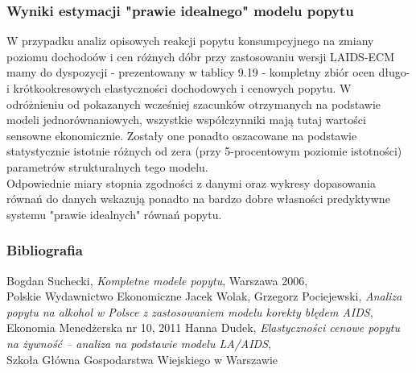 \documentclass[11pt,usenames,dvipsnames,svgnames,x11names]{beamer}\usepackage[]{graphicx}\usepackage[]{color}
\theoremstyle{definition}
\theoremstyle{remark}
\begin{document}
\begin{frame}%
\frametitle{Wyniki estymacji "prawie idealnego" modelu popytu }
W przypadku analiz opisowych reakcji popytu konsumpcyjnego na zmiany poziomu dochodoów i cen różnych dóbr przy zastosowaniu wersji LAIDS-ECM mamy do dyspozycji - prezentowany w tablicy 9.19 - kompletny zbiór ocen długo- i krótkookresowych elastyczności dochodowych i cenowych popytu. W odróżnieniu od pokazanych wcześniej szacunków otrzymanych na podstawie modeli jednorównaniowych, wszystkie współczynniki mają tutaj wartości sensowne ekonomicznie. Zostały one ponadto oszacowane na podstawie statystycznie istotnie różnych od zera (przy 5-procentowym poziomie istotności) parametrów strukturalnych tego modelu.\\
Odpowiednie miary stopnia zgodności z danymi oraz wykresy dopasowania równań do danych wskazują ponadto na bardzo dobre własności predyktywne systemu "prawie idealnych" równań popytu.
\end{frame}

\begin{frame}
\frametitle{Bibliografia}
\begin{center}
\begin{thebibliography}{9}
\bibitem{} Bogdan Suchecki, \emph{Kompletne modele popytu}, Warszawa 2006,\\ Polskie Wydawnictwo Ekonomiczne
\bibitem{} Jacek Wolak, Grzegorz Pociejewski, \emph{Analiza popytu na alkohol w Polsce z zastosowaniem modelu korekty błędem AIDS}, \\Ekonomia Menedżerska nr 10, 2011
\bibitem{} Hanna Dudek, \emph{Elastyczności cenowe popytu na żywność -- analiza na podstawie modelu LA/AIDS}, \\Szkoła Główna Gospodarstwa Wiejskiego w Warszawie
\end{thebibliography}
\end{center}
\end{frame}
\end{document}
